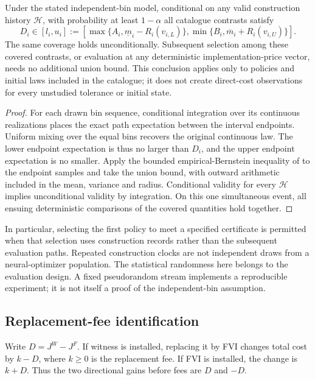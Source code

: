 \begin{theorem}\label{thm:conditional49}
Under the stated independent-bin model, conditional on any valid construction history $\mathcal H$, with probability at least $1-\alpha$ all catalogue contrasts satisfy
\begin{equation}\label{eq:direct49}
 D_i\in[l_i,u_i]:=
 [\max\{A_i,\underline m_i-R_i(v_{i,L})\},
  \min\{B_i,\overline m_i+R_i(v_{i,U})\}].
\end{equation}
The same coverage holds unconditionally. Subsequent selection among these covered contrasts, or evaluation at any deterministic implementation-price vector, needs no additional union bound. This conclusion applies only to policies and initial laws included in the catalogue; it does not create direct-cost observations for every unstudied tolerance or initial state.
\end{theorem}
\begin{proof}
For each drawn bin sequence, conditional integration over its continuous realizations places the exact path expectation between the interval endpoints. Uniform mixing over the equal bins recovers the original continuous law. The lower endpoint expectation is thus no larger than $D_i$, and the upper endpoint expectation is no smaller. Apply the bounded empirical-Bernstein inequality of \citet{maurer2009} to the endpoint samples and take the union bound, with outward arithmetic included in the mean, variance and radius. Conditional validity for every $\mathcal H$ implies unconditional validity by integration. On this one simultaneous event, all ensuing deterministic comparisons of the covered quantities hold together.
\end{proof}

In particular, selecting the first policy to meet a specified certificate is permitted when that selection uses construction records rather than the subsequent evaluation paths. Repeated construction clocks are not independent draws from a neural-optimizer population. The statistical randomness here belongs to the evaluation design. A fixed pseudorandom stream implements a reproducible experiment; it is not itself a proof of the independent-bin assumption.

\subsection{Replacement-fee identification}
Write $D=J^W-J^F$. If witness is installed, replacing it by FVI changes total cost by $k-D$, where $k\ge0$ is the replacement fee. If FVI is installed, the change is $k+D$. Thus the two directional gains before fees are $D$ and $-D$.

